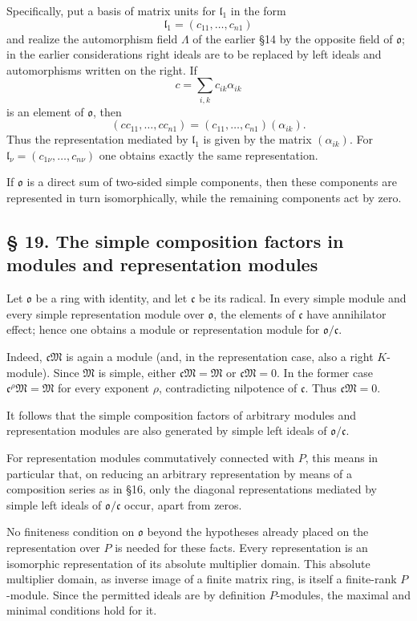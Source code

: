 \documentclass[11pt]{article}
\providecommand{\mM}{\mathfrak{M}}
\providecommand{\mo}{\mathfrak{o}}
\providecommand{\mc}{\mathfrak{c}}
\providecommand{\ml}{\mathfrak{l}}
\begin{document}
Specifically, put a basis of matrix units for $\ml_1$ in the form
\[
        \ml_1=(c_{11},\ldots,c_{n1})
\]
and realize the automorphism field $\Lambda$ of the earlier §14 by the opposite field of $\mo$; in the earlier considerations right ideals are to be replaced by left ideals and automorphisms written on the right. If
\[
        c=\sum_{i,k}c_{ik}\alpha_{ik}
\]
is an element of $\mo$, then
\[
        (cc_{11},\ldots,cc_{n1})=(c_{11},\ldots,c_{n1})(\alpha_{ik}).
\]
Thus the representation mediated by $\ml_1$ is given by the matrix $(\alpha_{ik})$. For $\ml_\nu=(c_{1\nu},\ldots,c_{n\nu})$ one obtains exactly the same representation.

If $\mo$ is a direct sum of two-sided simple components, then these components are represented in turn isomorphically, while the remaining components act by zero.

\subsection*{§ 19. The simple composition factors in modules and representation modules}
Let $\mo$ be a ring with identity, and let $\mc$ be its radical. In every simple module and every simple representation module over $\mo$, the elements of $\mc$ have annihilator effect; hence one obtains a module or representation module for $\mo/\mc$.

Indeed, $\mc\mM$ is again a module (and, in the representation case, also a right $K$-module). Since $\mM$ is simple, either $\mc\mM=\mM$ or $\mc\mM=0$. In the former case $\mc^\rho\mM=\mM$ for every exponent $\rho$, contradicting nilpotence of $\mc$. Thus $\mc\mM=0$.

It follows that the simple composition factors of arbitrary modules and representation modules are also generated by simple left ideals of $\mo/\mc$.

For representation modules commutatively connected with $P$, this means in particular that, on reducing an arbitrary representation by means of a composition series as in §16, only the diagonal representations mediated by simple left ideals of $\mo/\mc$ occur, apart from zeros.

No finiteness condition on $\mo$ beyond the hypotheses already placed on the representation over $P$ is needed for these facts. Every representation is an isomorphic representation of its absolute multiplier domain. This absolute multiplier domain, as inverse image of a finite matrix ring, is itself a finite-rank $P$-module. Since the permitted ideals are by definition $P$-modules, the maximal and minimal conditions hold for it.
\end{document}
